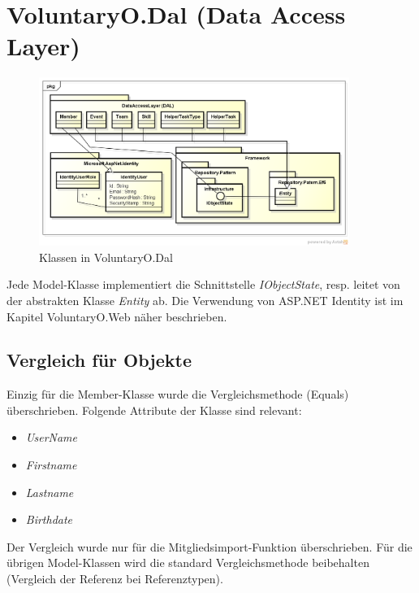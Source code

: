 \section{VoluntaryO.Dal (Data Access Layer)}
    \begin{figure}[h]
  		\vspace{-5pt}
    	\centering
    	\includegraphics[width=0.9\textwidth]{content/architekturdokumentation/images/VoluntaryO_Dal_Overview.png}
  		\vspace{-20pt}
    	\caption{Klassen in VoluntaryO.Dal}
	\end{figure}
	Jede Model-Klasse implementiert die Schnittstelle \textit{IObjectState}, resp. leitet von der abstrakten Klasse \textit{Entity} ab. Die Verwendung von ASP.NET Identity ist im Kapitel VoluntaryO.Web näher beschrieben.
	
	\subsection{Vergleich für Objekte}
		Einzig für die Member-Klasse wurde die Vergleichsmethode (Equals) überschrieben. Folgende Attribute der Klasse sind relevant:
		\\\begin{itemize}
			\item \textit{UserName}
			\item \textit{Firstname}
			\item \textit{Lastname}
			\item \textit{Birthdate}
		\end{itemize}
		Der Vergleich wurde nur für die Mitgliedsimport-Funktion überschrieben. Für die übrigen Model-Klassen wird die standard Vergleichsmethode beibehalten (Vergleich der Referenz bei Referenztypen).

